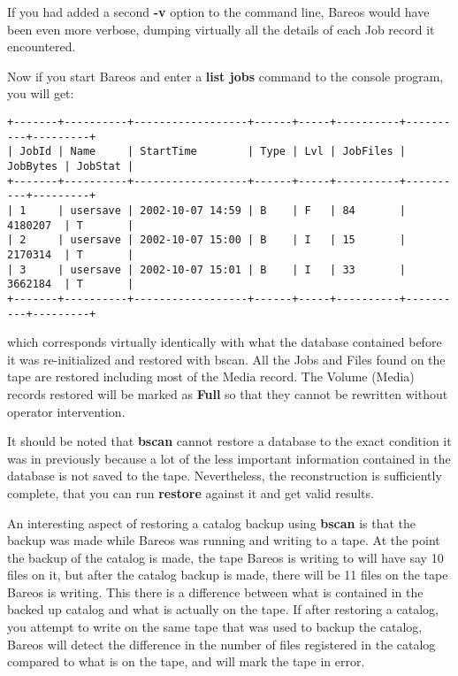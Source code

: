 If you had added a second {\bf -v} option to the command line, Bareos would
have been even more verbose, dumping virtually all the details of each Job
record it encountered.

Now if you start Bareos and enter a {\bf list jobs} command to the console
program, you will get:

\footnotesize
\begin{verbatim}
+-------+----------+------------------+------+-----+----------+----------+---------+
| JobId | Name     | StartTime        | Type | Lvl | JobFiles | JobBytes | JobStat |
+-------+----------+------------------+------+-----+----------+----------+---------+
| 1     | usersave | 2002-10-07 14:59 | B    | F   | 84       | 4180207  | T       |
| 2     | usersave | 2002-10-07 15:00 | B    | I   | 15       | 2170314  | T       |
| 3     | usersave | 2002-10-07 15:01 | B    | I   | 33       | 3662184  | T       |
+-------+----------+------------------+------+-----+----------+----------+---------+
\end{verbatim}
\normalsize

which corresponds virtually identically with what the database contained
before it was re-initialized and restored with bscan. All the Jobs and Files
found on the tape are restored including most of the Media record. The Volume
(Media) records restored will be marked as {\bf Full} so that they cannot be
rewritten without operator intervention.

It should be noted that {\bf bscan} cannot restore a database to the exact
condition it was in previously because a lot of the less important information
contained in the database is not saved to the tape. Nevertheless, the
reconstruction is sufficiently complete, that you can run {\bf restore}
against it and get valid results.

An interesting aspect of restoring a catalog backup using {\bf bscan} is
that the backup was made while Bareos was running and writing to a tape. At
the point the backup of the catalog is made, the tape Bareos is writing to
will have say 10 files on it, but after the catalog backup is made, there
will be 11 files on the tape Bareos is writing.  This there is a difference
between what is contained in the backed up catalog and what is actually on
the tape.  If after restoring a catalog, you attempt to write on the same
tape that was used to backup the catalog, Bareos will detect the difference
in the number of files registered in the catalog compared to what is on the
tape, and will mark the tape in error.

